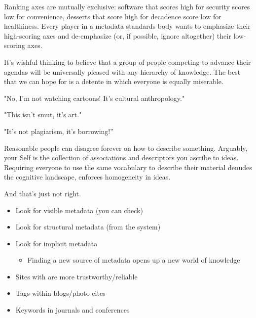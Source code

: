 \documentclass[a4paper,landscape,headrule,footrule,xetex]{foils}
\begin{document}

Ranking axes are mutually exclusive: software that scores high for
security scores low for convenience, desserts that score high for
decadence score low for healthiness. Every player in a metadata
standards body wants to emphasize their high-scoring axes and
de-emphasize (or, if possible, ignore altogether) their low-scoring
axes.

It's wishful thinking to believe that a group of people competing to
advance their agendas will be universally pleased with any hierarchy
of knowledge. The best that we can hope for is a detente in which
everyone is equally miserable.


"No, I'm not watching cartoons! It's cultural anthropology."

"This isn't smut, it's art."

"It's not plagiarism, it's borrowing!''

Reasonable people can disagree forever on how to describe something. Arguably, your Self is the collection of associations and descriptors you ascribe to ideas. Requiring everyone to use the same vocabulary to describe their material denudes the cognitive landscape, enforces homogeneity in ideas.

And that's just not right. 



\begin{itemize}
\item Look for visible metadata (you can check)
\item Look for structural metadata (from the system)
\item Look for implicit metadata
  \begin{itemize}
  \item Finding a new source of metadata opens up a new world of knowledge
  \end{itemize}
\end{itemize}

\begin{itemize}
\item Sites with  are more trustworthy/reliable
\item Tags within blogs/photo cites
\item Keywords in journals and conferences
\end{itemize}
\end{document}

